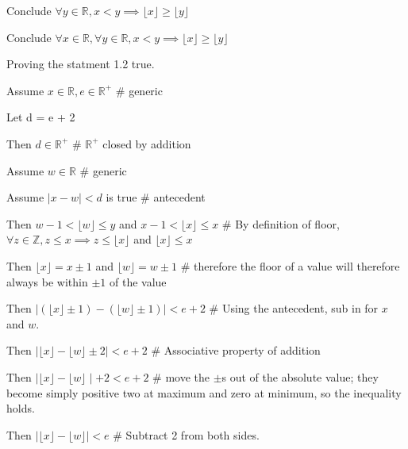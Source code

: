 \documentclass{article}
\newcommand{\floor}[1]{\lfloor #1\rfloor}
\begin{document}
\begin{enumerate}
\begin{description}
\begin{description}
\begin{description}
            \end{description}
        \item Conclude $\forall y \in \mathbb{R}, x < y \implies \floor{x} \geq \floor{y}$
        \end{description}
    \item Conclude $\forall x \in \mathbb{R}, \forall y \in \mathbb{R}, x < y \implies \floor{x} \geq \floor{y}$
    \end{description}
\item Proving the statment 1.2 true.
    \begin{description}
    \item Assume $x \in \mathbb{R}, e \in \mathbb{R}^+$ \# generic
        \begin{description}
        \item Let d = e + 2
        \item Then $d \in \mathbb{R}^+$ \# $\mathbb{R}^+$ closed by addition
        \item Assume $w \in \mathbb{R}$ \# generic
            \begin{description}
            \item Assume $\mid x - w \mid < d$ is true \# antecedent
                \begin{description}
                \item Then $w - 1 < \floor{w} \leq y$ and $x - 1 < \floor{x} \leq x$ \# By definition of floor, $\forall z \in \mathbb{Z}, z \leq x \implies z \leq \floor{x}$ and $\floor{x} \leq x$
                \item Then $\floor{x} = x \pm 1$ and $\floor{w} = w \pm 1$ \# therefore the floor of a value will therefore always be within $\pm 1$ of the value
                \item Then $\mid (\floor{x} \pm 1) - (\floor{w} \pm 1) \mid < e + 2$ \# Using the antecedent, sub in for $x$ and $w$.
                \item Then $\mid \floor{x} - \floor{w} \pm 2 \mid < e + 2$ \# Associative property of addition
                \item Then $\mid \floor{x} - \floor{w} \mid + 2 < e + 2$ \# move the $\pm$s out of the absolute value; they become simply positive two at maximum and zero at minimum, so the inequality holds.
                \item Then $\mid \floor{x} - \floor{w} \mid < e$ \# Subtract 2 from both sides.
                \end{description}
                        

\end{description}
\end{description}
\end{description}
\end{enumerate}
\end{document}
